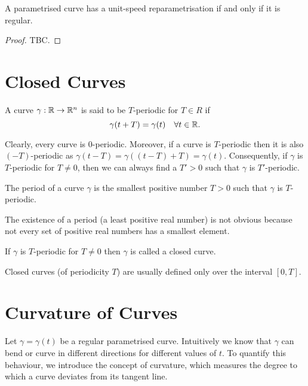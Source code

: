 \documentclass[11pt]{penrose}
\newcommand{\keyword}[1]{\textsf{#1}}
\begin{document}
\begin{nthm}
    A parametrised curve has a unit-speed reparametrisation if and only if it is regular.
\end{nthm}
\begin{proof}
    TBC.
\end{proof}

\section{Closed Curves}
\begin{ndfn}
    A curve $\gamma : \mathbb{R} \to \mathbb{R}^n$ is said to be \keyword{$T$-periodic} for $T \in R$ if
    \begin{equation}
        \gamma(t + T) = \gamma(t)
        \quad\forall t \in \mathbb{R}.
    \end{equation}
\end{ndfn}

Clearly, every curve is $0$-periodic. Moreover, if a curve is $T$-periodic then it is also $(-T)$-periodic as $\gamma(t - T) = \gamma((t-T) + T) = \gamma(t)$. Consequently, if $\gamma$ is $T$-periodic for $T \neq 0$, then we can always find a $T' > 0$ such that $\gamma$ is $T'$-periodic.

\begin{ndfn}
    The \keyword{period} of a curve $\gamma$ is the smallest positive number $T > 0$ such that $\gamma$ is $T$-periodic.
\end{ndfn}

The existence of a period (a least positive real number) is not obvious because not every set of positive real numbers has a smallest element.

\begin{ndfn}
    If $\gamma$ is $T$-periodic for $T \neq 0$ then $\gamma$ is called a \keyword{closed curve}.
\end{ndfn}

Closed curves (of periodicity $T$) are usually defined only over the interval $[0, T]$.

\section{Curvature of Curves}
Let $\gamma = \gamma(t)$ be a regular parametrised curve. Intuitively we know that $\gamma$ can bend or curve in different directions for different values of $t$. To quantify this behaviour, we introduce the concept of \keyword{curvature}, which measures the degree to which a curve deviates from its tangent line.
\end{document}
